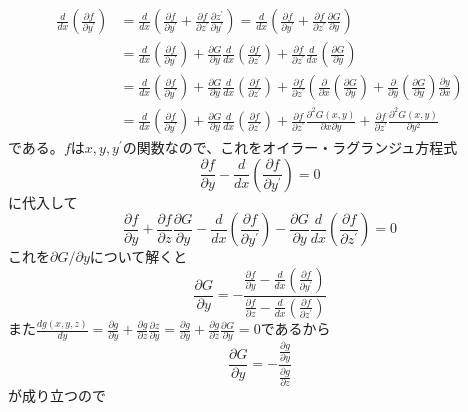 \documentclass{jsarticle}
\begin{document}
\begin{align*}
\frac{d}{dx}\left(\frac{\partial f}{\partial y^{\prime}}\right)&=\frac{d}{dx}\left(\frac{\partial f}{\partial y^{\prime}}+\frac{\partial f}{\partial z^{\prime}}\frac{\partial z^{\prime}}{\partial y^{\prime}}\right)=\frac{d}{dx}\left(\frac{\partial f}{\partial y^{\prime}}+\frac{\partial f}{\partial z^{\prime}}\frac{\partial G}{\partial y}\right)\\
&=\frac{d}{dx}\left(\frac{\partial f}{\partial y^{\prime}}\right)+\frac{\partial G}{\partial y}\frac{d}{dx}\left(\frac{\partial f}{\partial z^{\prime}}\right)+\frac{\partial f}{\partial z^{\prime}}\frac{d}{dx}\left(\frac{\partial G}{\partial y}\right)\\
&=\frac{d}{dx}\left(\frac{\partial f}{\partial y^{\prime}}\right)+\frac{\partial G}{\partial y}\frac{d}{dx}\left(\frac{\partial f}{\partial z^{\prime}}\right)+\frac{\partial f}{\partial z^{\prime}}\left(\frac{\partial}{\partial x}\left(\frac{\partial G}{\partial y}\right)+\frac{\partial}{\partial y}\left(\frac{\partial G}{\partial y}\right)\frac{\partial y}{\partial x}\right)\\
&=\frac{d}{dx}\left(\frac{\partial f}{\partial y^{\prime}}\right)+\frac{\partial G}{\partial y}\frac{d}{dx}\left(\frac{\partial f}{\partial z^{\prime}}\right)+\frac{\partial f}{\partial z^{\prime}}\frac{\partial^{2}G(x,y)}{\partial x\partial y}+\frac{\partial f}{\partial z^{\prime}}\frac{\partial^{2}G(x,y)}{\partial y^{2}}
\end{align*}
である。\(f\)は\(x,y,y^{\prime}\)の関数なので、これをオイラー・ラグランジュ方程式
\[\frac{\partial f}{\partial y}-\frac{d}{dx}\left(\frac{\partial f}{\partial y^{\prime}}\right)=0\]
に代入して
\[\frac{\partial f}{\partial y}+\frac{\partial f}{\partial z}\frac{\partial G}{\partial y}-\frac{d}{dx}\left(\frac{\partial f}{\partial y^{\prime}}\right)-\frac{\partial G}{\partial y}\frac{d}{dx}\left(\frac{\partial f}{\partial z^{\prime}}\right)=0\]
これを\(\partial G/\partial y\)について解くと
\[\frac{\partial G}{\partial y}=-\frac{\frac{\partial f}{\partial y}-\frac{d}{dx}\left(\frac{\partial f}{\partial y^{\prime}}\right)}{\frac{\partial f}{\partial z}-\frac{d}{dx}\left(\frac{\partial f}{\partial z^{\prime}}\right)}\]
また\(\displaystyle\frac{dg(x,y,z)}{dy}=\frac{\partial g}{\partial y}+\frac{\partial g}{\partial z}\frac{\partial z}{\partial y}=\frac{\partial g}{\partial y}+\frac{\partial g}{\partial z}\frac{\partial G}{\partial y}=0\)であるから
\[\frac{\partial G}{\partial y}=-\frac{\frac{\partial g}{\partial y}}{\frac{\partial g}{\partial z}}\]
が成り立つので
\end{document}

